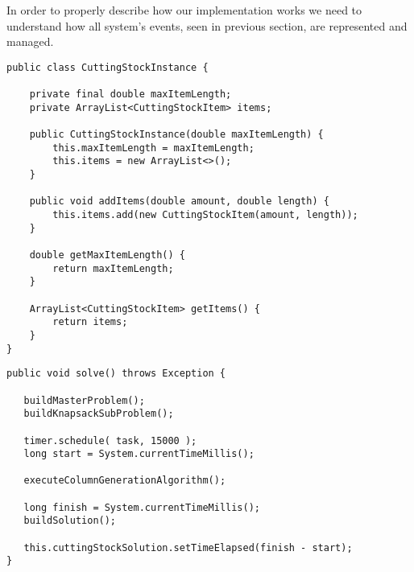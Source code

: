 \documentclass[10pt,a4paper]{article}
\begin{document}
In order to properly describe how our implementation works we need to understand how all system's events, seen in previous section, are represented and managed.

\begin{lstlisting}[frame=lines, caption={\texttt{CuttingStockInstance} class implementation.}, label={code:instance}]
public class CuttingStockInstance {

    private final double maxItemLength;
    private ArrayList<CuttingStockItem> items;

    public CuttingStockInstance(double maxItemLength) {
        this.maxItemLength = maxItemLength;
        this.items = new ArrayList<>();
    }

    public void addItems(double amount, double length) {
        this.items.add(new CuttingStockItem(amount, length));
    }

    double getMaxItemLength() {
        return maxItemLength;
    }

    ArrayList<CuttingStockItem> getItems() {
        return items;
    }
}
\end{lstlisting}


\begin{lstlisting}[frame=lines, caption={\texttt{solve()} method implementation.}, label={code:solve}]
public void solve() throws Exception {

   buildMasterProblem();
   buildKnapsackSubProblem();

   timer.schedule( task, 15000 );
   long start = System.currentTimeMillis();
        
   executeColumnGenerationAlgorithm();
        
   long finish = System.currentTimeMillis();
   buildSolution();

   this.cuttingStockSolution.setTimeElapsed(finish - start);
}
\end{lstlisting}
\end{document}
